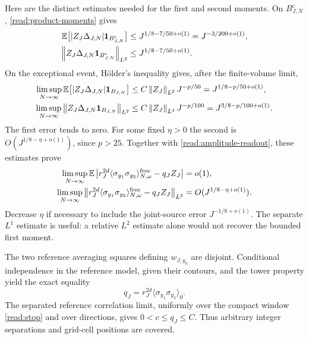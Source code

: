 Here are the distinct estimates needed for the first and second
moments.  On $B_{J,N}^{\mathrm c}$, \eqref{read:product-moments} gives
\begin{align*}
 \mathbb E\bigl[|Z_J\Delta_{J,N}|\mathbf 1_{B_{J,N}^{\mathrm c}}\bigr]
     &\le J^{1/8-7/50+o(1)}=J^{-3/200+o(1)},\\
 \left\lVert Z_J\Delta_{J,N}\mathbf 1_{B_{J,N}^{\mathrm c}}\right\rVert_{L^2}
     &\le J^{1/8-7/50+o(1)}.
\end{align*}
On the exceptional event, H\"older's inequality gives, after the
finite-volume limit,
\begin{align*}
 \limsup_{N\to\infty}
 \mathbb E\bigl[|Z_J\Delta_{J,N}|\mathbf 1_{B_{J,N}}\bigr]
     &\le C\left\lVert Z_J\right\rVert_{L^2}J^{-p/50}
       =J^{1/8-p/50+o(1)},\\
 \limsup_{N\to\infty}
 \left\lVert Z_J\Delta_{J,N}\mathbf 1_{B_{J,N}}\right\rVert_{L^2}
     &\le C\left\lVert Z_J\right\rVert_{L^4}J^{-p/100}
       =J^{3/8-p/100+o(1)}.
\end{align*}
The first error tends to zero.  For some fixed $\eta>0$ the second
is $O(J^{1/8-\eta+o(1)})$, since $p>25$.  Together with
\eqref{read:amplitude-readout}, these estimates prove
\begin{equation}
 \begin{split}
 \limsup_{N\to\infty}
 \mathbb E\left|r_J^{2d}
  \langle\sigma_{y_1}\sigma_{y_2}\rangle^{\mathrm{free}}_{N,\omega}
       -q_JZ_J\right|&=o(1),\\
 \limsup_{N\to\infty}
 \left\lVert r_J^{2d}
  \langle\sigma_{y_1}\sigma_{y_2}\rangle^{\mathrm{free}}_{N,\omega}
       -q_JZ_J\right\rVert_{L^2}
       &=O(J^{1/8-\eta+o(1)}).
 \end{split}
 \label{read:two-errors}
\end{equation}
Decrease $\eta$ if necessary to include the joint-source error
$J^{-1/8+o(1)}$.  The separate $L^1$ estimate is useful: a relative
$L^2$ estimate alone would not recover the bounded first moment.

The two reference averaging squares defining $w_{J,y_a}$ are
disjoint.  Conditional independence in the reference model, given
their contours, and the tower property yield the exact equality
\begin{equation}
 q_J=r_J^{2d}\langle\sigma_{y_1}\sigma_{y_2}\rangle_0.
 \label{read:reference-pair}
\end{equation}
The separated reference correlation limit, uniformly over the
compact window \eqref{read:stop} and over directions, gives
$0<c\le q_J\le C$.  Thus arbitrary integer separations and grid-cell
positions are covered.

